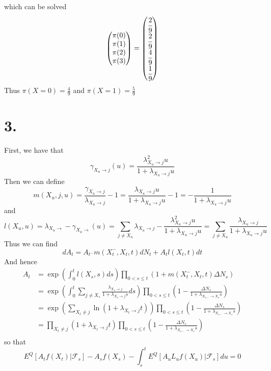 \documentclass[11pt]{article}
\begin{document}
which can be solved 
\[
    \begin{pmatrix}
        \pi(0) \\
        \pi(1) \\
        \pi(2) \\
        \pi(3) 
    \end{pmatrix}
    = 
    \begin{pmatrix}
        \cfrac{2}{9}\\
        \cfrac{2}{9}\\
        \cfrac{4}{9}\\
        \cfrac{1}{9}
    \end{pmatrix}
\]
Thus $\pi(X = 0) = \frac{4}{9}$ and $\pi(X = 1) = \frac{5}{9}$
\newpage
\section*{3.}
First, we have that 
\[
    \gamma_{X_u\to j}(u) = \frac{\lambda^2_{X_u\to j} u }{1 + \lambda_{X_u \to j} u}
\]
Then we can define 
\[
    m(X_u, j, u) = \frac{\gamma_{X_u \to j}}{\lambda_{X_u \to j}}-1 = \frac{\lambda_{X_u \to j}u}{1 + \lambda_{X_u \to j} u} - 1 = - \frac{1}{1 + \lambda_{X_u \to j}u}
\]
and 
\[
    l(X_u, u) = \lambda_{X_u \to} - \gamma_{X_u \to}(u) = \sum_{j \ne X_u} \lambda_{X_u \to j} - \frac{\lambda^2_{X_u \to j}u}{1+\lambda_{X_u \to j}u} = \sum_{j \ne X_u} \frac{\lambda_{X_u\to j}}{1 + \lambda_{X_u \to j}u}
\]
Thus we can find
\[
    dA_t = A_{t^-} m(X_t^-, X_t, t)dN_t + A_t l(X_t,t)dt
\]
And hence 
\begin{align*}
    A_t &= \exp\left(\int_0^t l(X_s, s) ds \right) \prod_{0 < s \le t} \left(1 + m(X_t^-, X_t, t)\Delta N_s \right) \\
        &= \exp\left(\int_0^t \sum_{j \ne X_s} \frac{\lambda_{X_s\to j}}{1 + \lambda_{X_s \to j}s} ds \right) \prod_{0 < s \le t} \left(1 - \frac{\Delta N_s}{1 + \lambda_{X_{s-} \to X_s}s}\right) \\
        &= \exp\left(\sum_{X_t \ne j} \ln(1 + \lambda_{X_t \to j}t)\right)  \prod_{0 < s \le t} \left(1 - \frac{\Delta N_s}{1 + \lambda_{X_{s-} \to X_s}s}\right) \\
        &= \prod_{X_t \ne j} (1 + \lambda_{X_t \to j} t)\prod_{0 < s \le t} \left(1 - \frac{\Delta N_s}{1 + \lambda_{X_{s-} \to X_s}s}\right) \\
\end{align*}
so that 
\[
    E^Q[A_tf(X_t)|\mathcal{F}_s] - A_s f(X_s) - \int_s^t E^Q[A_u L_uf(X_u)|\mathcal{F}_s] du = 0
\]
\newpage
\end{document}
